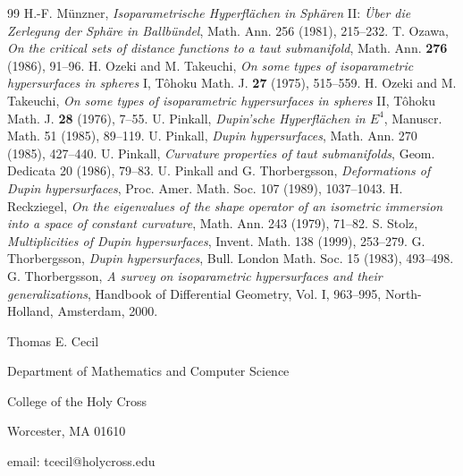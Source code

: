 \documentclass[12pt]{article}
\begin{document}
\begin{thebibliography}{99}
 H.-F. M\"{u}nzner, {\em Isoparametrische Hyperfl\"{a}chen in Sph\"{a}ren} II:
{\em \"{U}ber die Zerlegung 
der Sph\"{a}re in Ballb\"{u}ndel}, Math. Ann. 256 (1981), 215--232.
 T. Ozawa, {\em On the critical sets of distance functions
to a taut submanifold}, Math. Ann. {\bf 276} (1986), 91--96.
 H. Ozeki and M. Takeuchi, {\em On some types of
isoparametric hypersurfaces in spheres} I, T\^{o}hoku
Math. J. {\bf 27} (1975), 515--559.
 H. Ozeki and M. Takeuchi, {\em On some types of
isoparametric hypersurfaces in spheres} II, T\^{o}hoku
Math. J. {\bf 28} (1976), 7--55.
 U. Pinkall, {\em Dupin'sche
Hyperfl\"{a}chen in $E^4$}, Manuscr. Math. 51 (1985), 89--119.
 U. Pinkall, {\em Dupin
hypersurfaces}, Math. Ann. 270 (1985), 427--440.
 U. Pinkall, {\em Curvature
properties of taut submanifolds}, Geom. Dedicata 20 (1986), 79--83.
U. Pinkall and G. Thorbergsson, {\em Deformations
of Dupin hypersurfaces}, Proc. Amer. Math. Soc. 107 (1989), 1037--1043.
 H. Reckziegel, {\em On the eigenvalues of the shape
operator of an isometric immersion into a space of constant curvature},
Math. Ann. 243 (1979), 71--82.
 S. Stolz, {\em Multiplicities of Dupin hypersurfaces},
Invent. Math. 138 (1999), 253--279.
G. Thorbergsson, {\em Dupin hypersurfaces}, Bull. London Math. Soc. 15 (1983), 493--498.
G. Thorbergsson, {\em A survey
on isoparametric hypersurfaces and their generalizations},
Handbook of Differential Geometry, Vol. I, 963--995,
North-Holland, Amsterdam, 2000.
\end{thebibliography}



\noindent Thomas E. Cecil

\noindent Department of Mathematics and Computer Science

\noindent College of the Holy Cross

\noindent Worcester, MA 01610

\noindent email: tcecil@holycross.edu\\
\end{document}
